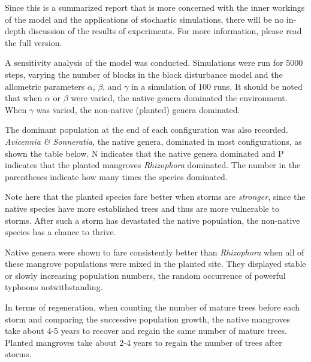Since this is a summarized report that is more concerned with the inner workings
of the model and the applications of stochastic simulations, there will be no in-depth
discussion of the results of experiments. For more information, please read the full version. 

A sensitivity analysis of the model was conducted. Simulations were run for 5000 steps, varying the number of blocks in the block disturbance model and the allometric
parameters $\alpha$, $\beta$, and $\gamma$ in a simulation of 100 runs. It should be noted that when $\alpha$ or $\beta$ were varied, the native genera dominated the environment. When $\gamma$ was varied, the non-native (planted) genera dominated.

The dominant population at the end of each configuration was also recorded. \emph{Avicennia \& Sonneratia}, the native genera, dominated in most configurations, as shown the table below. N indicates that the native genera dominated and P indicates that the planted mangroves \emph{Rhizophora} dominated. The number in the parentheses indicate how many times the species dominated.


Note here that the planted species fare better when storms are \emph{stronger},
since the native species have more established trees and thus are more vulnerable to
storms. After such a storm has devastated the native population, the non-native species
has a chance to thrive.

Native genera were shown to fare consistently better
than \emph{Rhizophora} when all of these mangrove populations were mixed
in the planted site. They displayed stable or slowly increasing
population numbers, the random occurrence of powerful typhoons
notwithstanding. 

In terms of regeneration, when counting the number of mature trees before each storm
and comparing the successive population growth, the native mangroves take about 4-5 years
to recover and regain the same number of mature trees. Planted mangroves take about 2-4 years to regain the number of trees after storms.

